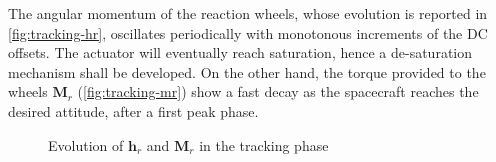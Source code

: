 The angular momentum of the reaction wheels, whose evolution is reported in \cref{fig:tracking-hr}, oscillates periodically with monotonous increments of the DC offsets. The actuator will eventually reach saturation, hence a de-saturation mechanism shall be developed. On the other hand, the torque provided to the wheels $\mathbf{M}_r$ (\cref{fig:tracking-mr}) show a fast decay as the spacecraft reaches the desired attitude, after a first peak phase.

\begin{figure}[h!]
    \centering
    \caption{Evolution of $\mathbf{h}_r$ and $\mathbf{M}_r$ in the tracking phase}
    \label{fig:tracking-rw}
\end{figure}